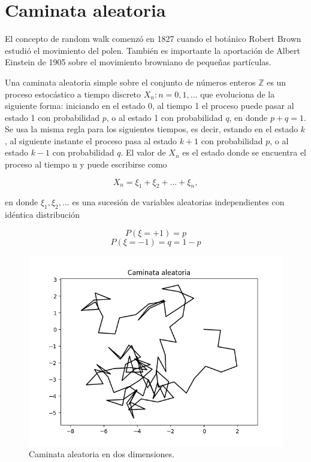 \pagebreak

\section{Caminata aleatoria}

El concepto de random walk comenzó en 1827 cuando el botánico Robert Brown
estudió el movimiento del polen. También es importante la aportación de Albert
Einstein de 1905 sobre el movimiento browniano de pequeñas partículas.

Una caminata aleatoria simple sobre el conjunto de números enteros $\mathbb{Z}$
es un proceso estocástico a tiempo discreto $X_n : n=0,1, ...$ que evoluciona de
la siguiente forma: iniciando en el estado 0, al tiempo 1 el proceso puede pasar
al estado 1 con probabilidad $p$, o al estado 1 con probabilidad $q$, en donde
$p+q=1$. Se usa la misma regla para los siguientes tiempos, es decir, estando en
el estado $k$, al siguiente instante el proceso pasa al estado $k+1$ con
probabilidad $p$, o al estado $k-1$ con probabilidad $q$. El valor de $X_n$ es
el estado donde se encuentra el proceso al tiempo n y puede escribirse como

\begin{equation}
    X_n = \xi_1 + \xi_2 + ... + \xi_n,
\end{equation}

en donde $\xi_1, \xi_2,...$  es una sucesión de variables aleatorias
independientes con idéntica distribución

\begin{equation}
    P(\xi=+1) = p
\end{equation}
\begin{equation}
    P(\xi=-1) = q = 1-p
\end{equation}

\begin{figure}[h!]
    \centering
    \includegraphics[scale=0.8]{figures/Random_walk.png}
    \caption{Caminata aleatoria en dos dimensiones.}
\end{figure}

